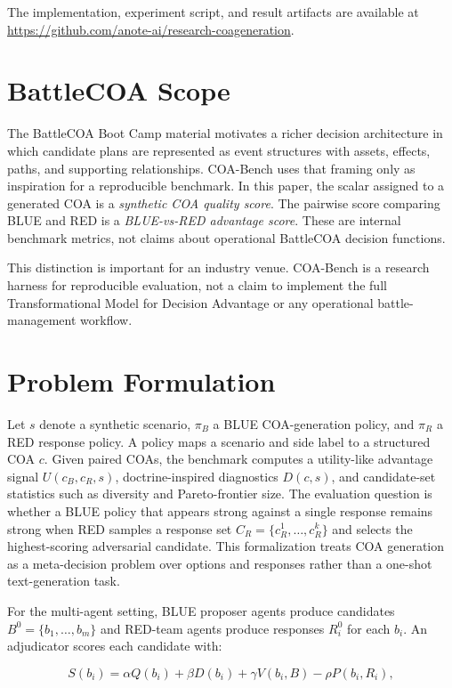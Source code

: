 \documentclass[sigconf]{acmart}
\begin{document}
The implementation, experiment script, and result artifacts are available at \url{https://github.com/anote-ai/research-coageneration}.

\section{BattleCOA Scope}

The BattleCOA Boot Camp material motivates a richer decision architecture in which candidate plans are represented as event structures with assets, effects, paths, and supporting relationships. COA-Bench uses that framing only as inspiration for a reproducible benchmark. In this paper, the scalar assigned to a generated COA is a \emph{synthetic COA quality score}. The pairwise score comparing BLUE and RED is a \emph{BLUE-vs-RED advantage score}. These are internal benchmark metrics, not claims about operational BattleCOA decision functions.

This distinction is important for an industry venue. COA-Bench is a research harness for reproducible evaluation, not a claim to implement the full Transformational Model for Decision Advantage or any operational battle-management workflow.

\section{Problem Formulation}

Let $s$ denote a synthetic scenario, $\pi_B$ a BLUE COA-generation policy, and $\pi_R$ a RED response policy. A policy maps a scenario and side label to a structured COA $c$. Given paired COAs, the benchmark computes a utility-like advantage signal $U(c_B,c_R,s)$, doctrine-inspired diagnostics $D(c,s)$, and candidate-set statistics such as diversity and Pareto-frontier size. The evaluation question is whether a BLUE policy that appears strong against a single response remains strong when RED samples a response set $C_R=\{c_R^1,\ldots,c_R^k\}$ and selects the highest-scoring adversarial candidate. This formalization treats COA generation as a meta-decision problem over options and responses rather than a one-shot text-generation task.

For the multi-agent setting, BLUE proposer agents produce candidates $B^0=\{b_1,\ldots,b_m\}$ and RED-team agents produce responses $R_i^0$ for each $b_i$. An adjudicator scores each candidate with:

\begin{equation}
S(b_i) = \alpha Q(b_i)+\beta D(b_i)+\gamma V(b_i,B)-\rho P(b_i,R_i),
\end{equation}
\end{document}
